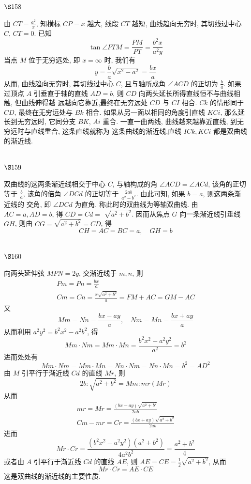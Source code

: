 \section{$\S 158$}

由 $C T=\frac{a^{2}}{x}$, 知横标 $C P=x$ 越大, 线段 $C T$ 越短, 曲线趋向无穷时, 其切线过中心 $C$, $C T=0$. 已知
\[
\tan \angle P T M=\frac{P M}{P T}=\frac{b^{2} x}{a^{2} y}
\]
当点 $M$ 位于无穷远处, 即 $x=\infty$ 时, 我们有
\[
y=\frac{b}{a} \sqrt{x^{2}-a^{2}}=\frac{b x}{a}
\]
从而, 曲线趋向无穷时, 其切线过中心 $C$, 且与轴所成角 $\angle A C D$ 的正切为 $\frac{b}{a}$. 如果过顶点 $A$ 引垂直于轴的直线 $A D=b$, 则 $C D$ 向两头延长所得直线恒不与曲线相触, 但曲线伸得越 远越向它靠近,最终在无穷远处 $C D$ 与 $C I$ 相合. $C k$ 的情形同于 $C D$, 最终在无穷远处与 $B k$ 相合. 如果从另一面以相同的角度引直线 $K C i$, 那么延长到无穷远时, 它同分支 $B K$, $A i$ 重合. 一直一曲两线, 曲线越来越靠近直线, 到无穷远时与直线重合, 这条直线就称为 这条曲线的渐近线,直线 $I C k, K C i$ 都是双曲线的渐近线.

\section{$\S 159$}

双曲线的这两条渐近线相交于中心 $C$, 与轴构成的角 $\angle A C D=\angle A C d$, 该角的正切 等于 $\frac{b}{a}$, 该角的倍角 $\angle D C d$ 的正切等于 $\frac{2 a b}{a^{2}-b^{2}}$. 由此可知, 如果 $b=a$, 则这两条渐近线的 交角, 即 $\angle D C d$ 为直角, 称此时的双曲线为等轴双曲线. 由 $A C=a, A D=b$, 得 $C D=C d=$ $\sqrt{a^{2}+b^{2}}$. 因而从焦点 $G$ 向一条渐近线引垂线 $G H$, 则由 $C G=\sqrt{a^{2}+b^{2}}=C D$, 得
\[
C H=A C=B C=a, \quad G H=b
\]
\section{$\S 160$}

向两头延伸弦 $M P N=2 y$, 交渐近线于 $m, n$, 则
\[
\begin{gathered}
P m=P n=\frac{b x}{a} \\
C m=C n=\frac{x \sqrt{a^{2}+b^{2}}}{a}=F M+A C=G M-A C
\end{gathered}
\]
又
\[
M m=N n=\frac{b x-a y}{a}, \quad N m=M n=\frac{b x+a y}{a}
\]
从而利用 $a^{2} y^{2}=b^{2} x^{2}-a^{2} b^{2}$, 得
\[
M m \cdot N m=M m \cdot M n=\frac{b^{2} x^{2}-a^{2} y^{2}}{a^{2}}=b^{2}
\]
进而处处有
\[
M m \cdot N m=M m \cdot M n=N n \cdot N m=N n \cdot M n=b^{2}=A D^{2}
\]
由 $M$ 引平行于渐近线 $C d$ 的直线 $M r$, 则
\[
2 b: \sqrt{a^{2}+b^{2}}=M m: m r(M r)
\]
从而
\[
\begin{gathered}
m r=M r=\frac{(b x-a y) \sqrt{a^{2}+b^{2}}}{2 a b} \\
C m-m r=C r=\frac{(b x+a y) \sqrt{a^{2}+b^{2}}}{2 a b}
\end{gathered}
\]
进而
\[
M r \cdot C r=\frac{\left(b^{2} x^{2}-a^{2} y^{2}\right)\left(a^{2}+b^{2}\right)}{4 a^{2} b^{2}}=\frac{a^{2}+b^{2}}{4}
\]
或者由 $A$ 引平行于渐近线 $C d$ 的直线 $A E$, 则 $A E=C E=\frac{1}{2} \sqrt{a^{2}+b^{2}}$, 从而
\[
M r \cdot C r=A E \cdot C E
\]
这是双曲线的渐近线的主要性质.


